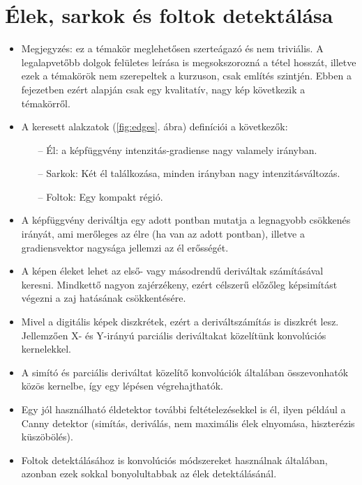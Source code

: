 \documentclass[12pt]{article}
\theoremstyle{plain}
\begin{document}
\section{Élek, sarkok és foltok detektálása}
\begin{itemize}
    \item Megjegyzés: ez a témakör meglehetősen szerteágazó és nem triviális. A legalapvetőbb dolgok felületes leírása is megsokszorozná a tétel hosszát, illetve ezek a témakörök nem szerepeltek a kurzuson, csak említés szintjén. Ebben a fejezetben ezért \cite{el} alapján csak egy kvalitatív, nagy kép következik a témakörről.

    \item A keresett alakzatok (\ref{fig:edges}. ábra) definíciói a következők:
    \begin{itemize}
        \item[--] Él: a képfüggvény intenzitás-gradiense nagy valamely irányban. 
        \item[--] Sarkok: Két él találkozása, minden irányban nagy intenzitásváltozás.
        \item[--] Foltok: Egy kompakt régió.
    \end{itemize}{}
    
    \item A képfüggvény deriváltja egy adott pontban mutatja a legnagyobb csökkenés irányát, ami merőleges az élre (ha van az adott pontban), illetve a gradiensvektor nagysága jellemzi az él erősségét.
    \item A képen éleket lehet az első- vagy másodrendű deriváltak számításával keresni. Mindkettő nagyon zajérzékeny, ezért célszerű előzőleg képsimítást végezni a zaj hatásának csökkentésére.
    \item Mivel a digitális képek diszkrétek, ezért a deriváltszámítás is diszkrét lesz. Jellemzően X- és Y-irányú parciális deriváltakat közelítünk konvolúciós kernelekkel.

    \item A simító és parciális deriváltat közelítő konvolúciók általában összevonhatók közös kernelbe, így egy lépésen végrehajthatók.

    \item Egy jól használható éldetektor további feltételezésekkel is él, ilyen például a Canny detektor (simítás, deriválás, nem maximális élek elnyomása, hiszterézis küszöbölés).
    
    \item Foltok detektálásához is konvolúciós módszereket használnak általában, azonban ezek sokkal bonyolultabbak az élek detektálásánál.
    
\end{itemize}{}
\end{document}
